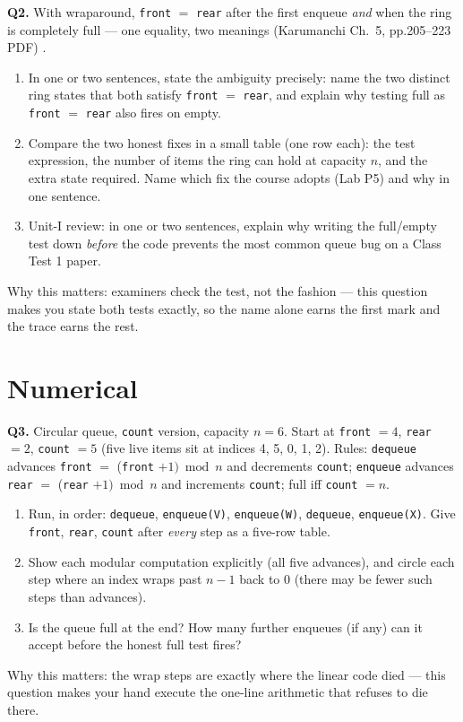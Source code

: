 \documentclass[11pt]{article}
\begin{document}
\textbf{Q2.} With wraparound, \texttt{front} $=$ \texttt{rear} after the first enqueue \emph{and} when the ring is completely full --- one equality, two meanings (Karumanchi Ch.~5, pp.205--223 PDF) \cite{Karumanchi2017_data_structures_algorithms_made_easy}.
\begin{enumerate}
  \item[(a)] In one or two sentences, state the ambiguity precisely: name the two distinct ring states that both satisfy \texttt{front} $=$ \texttt{rear}, and explain why testing full as \texttt{front} $=$ \texttt{rear} also fires on empty.
  \item[(b)] Compare the two honest fixes in a small table (one row each): the test expression, the number of items the ring can hold at capacity $n$, and the extra state required. Name which fix the course adopts (Lab P5) and why in one sentence.
  \item[(c)] Unit-I review: in one or two sentences, explain why writing the full/empty test down \emph{before} the code prevents the most common queue bug on a Class Test 1 paper.
\end{enumerate}
Why this matters: examiners check the test, not the fashion --- this question makes you state both tests exactly, so the name alone earns the first mark and the trace earns the rest.

\section{Numerical}

\textbf{Q3.} Circular queue, \texttt{count} version, capacity $n = 6$. Start at \texttt{front} $= 4$, \texttt{rear} $= 2$, \texttt{count} $= 5$ (five live items sit at indices 4, 5, 0, 1, 2). Rules: \texttt{dequeue} advances \texttt{front} $=$ (\texttt{front} $+ 1) \bmod n$ and decrements \texttt{count}; \texttt{enqueue} advances \texttt{rear} $=$ (\texttt{rear} $+ 1) \bmod n$ and increments \texttt{count}; full iff \texttt{count} $= n$.
\begin{enumerate}
  \item[(a)] Run, in order: \texttt{dequeue}, \texttt{enqueue(V)}, \texttt{enqueue(W)}, \texttt{dequeue}, \texttt{enqueue(X)}. Give \texttt{front}, \texttt{rear}, \texttt{count} after \emph{every} step as a five-row table.
  \item[(b)] Show each modular computation explicitly (all five advances), and circle each step where an index wraps past $n - 1$ back to $0$ (there may be fewer such steps than advances).
  \item[(c)] Is the queue full at the end? How many further enqueues (if any) can it accept before the honest full test fires?
\end{enumerate}
Why this matters: the wrap steps are exactly where the linear code died --- this question makes your hand execute the one-line arithmetic that refuses to die there.
\end{document}
